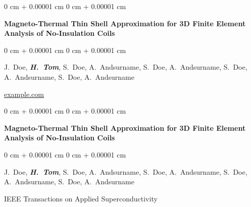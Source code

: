 \documentclass[10pt, letterpaper]{article}
\newenvironment{onecolentry}{
    \begin{adjustwidth}{
        0 cm + 0.00001 cm
    }{
        0 cm + 0.00001 cm
    }
}{
    \end{adjustwidth}
} %
\begin{document}
        \vspace{0.2 cm}

        \begin{samepage}
            \begin{onecolentry}
                \textbf{Magneto-Thermal Thin Shell Approximation for 3D Finite Element Analysis of No-Insulation Coils}
            \end{onecolentry}

            \vspace{0.10 cm}
            
            \begin{onecolentry}
                \mbox{J. Doe}, \mbox{\textbf{\textit{H. Tom}}}, \mbox{S. Doe}, \mbox{A. Andsurname}, \mbox{S. Doe}, \mbox{A. Andsurname}, \mbox{S. Doe}, \mbox{A. Andsurname}, \mbox{S. Doe}, \mbox{A. Andsurname}

                \vspace{0.10 cm}
                
        \href{https://example.com}{example.com}\end{onecolentry}
        \end{samepage}

        \vspace{0.2 cm}

        \begin{samepage}
            \begin{onecolentry}
                \textbf{Magneto-Thermal Thin Shell Approximation for 3D Finite Element Analysis of No-Insulation Coils}
            \end{onecolentry}

            \vspace{0.10 cm}
            
            \begin{onecolentry}
                \mbox{J. Doe}, \mbox{\textbf{\textit{H. Tom}}}, \mbox{S. Doe}, \mbox{A. Andsurname}, \mbox{S. Doe}, \mbox{A. Andsurname}, \mbox{S. Doe}, \mbox{A. Andsurname}, \mbox{S. Doe}, \mbox{A. Andsurname}

                \vspace{0.10 cm}
                
        IEEE Transactions on Applied Superconductivity\end{onecolentry}
        \end{samepage}

        \vspace{0.2 cm}
\end{document}
